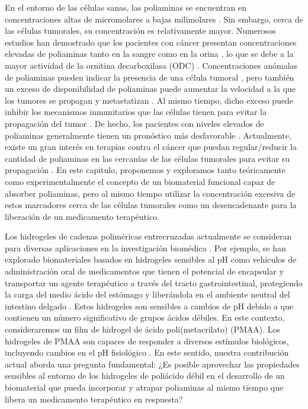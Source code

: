 En el entorno de las c\'elulas sanas, las poliaminas se encuentran en concentraciones altas de micromolares a bajas milimolares \cite{porter1983, Russell}.
Sin embargo, cerca de las c\'elulas tumorales, su concentraci\'on es relativamente mayor.
Numerosos estudios han demostrado que los pacientes con c\'ancer presentan concentraciones elevadas de poliaminas tanto en la sangre como en la orina \cite{russell1971}, lo que se debe a la mayor actividad de la ornitina decarboxilasa (ODC) \cite{Soda2011,agostinelli2010polyamines,nowotarski2013}.
Concentraciones an\'omalas de poliaminas pueden indicar la presencia de una c\'elula tumoral \cite{park2013,gerner2004}, pero tambi\'en un exceso de disponibilidad de poliaminas puede aumentar la velocidad a la que los tumores se propagan y metastatizan \cite{Soda2011}.
Al mismo tiempo, dicho exceso puede inhibir los mecanismos inmunitarios que las c\'elulas tienen para evitar la propagaci\'on del tumor \cite{Soda2011,jasnis1994polyamines}.
De hecho, los pacientes con niveles elevados de poliaminas generalmente tienen un pron\'ostico m\'as desfavorable \cite{Soda2011,ikeda2011montmorillonite}.
Actualmente, existe un gran inter\'es en terapias contra el c\'ancer que puedan regular/reducir la cantidad de poliaminas en las cercan\'ias de las c\'elulas tumorales para evitar su propagaci\'on \cite{Soda2011,aziz1996potential,chen2006combination, bachrach2004polyamines}.
En este capitulo, proponemos y exploramos tanto te\'oricamente como experimentalmente el concepto de un biomaterial funcional capaz de absorber poliaminas, pero al mismo tiempo utilizar la concentraci\'on excesiva de estos marcadores cerca de las c\'elulas tumorales como un desencadenante para la liberaci\'on de un medicamento terap\'eutico.

Los hidrogeles de cadenas polim\'ericas entrecruzadas actualmente se consideran para diversas aplicaciones en la investigaci\'on biom\'edica \cite{wang2019}.
Por ejemplo, se han explorado biomateriales basados en hidrogeles sensibles al pH como veh\'iculos de administraci\'on oral de medicamentos que tienen el potencial de encapsular y transportar un agente terap\'eutico a trav\'es del tracto gastrointestinal, protegiendo la carga del medio \'acido del est\'omago y liber\'andola en el ambiente neutral del intestino delgado  \cite{lowman1999,zhao2019,qindeel2019,li2019}.
Estos hidrogeles son sensibles a cambios de pH debido a que contienen un n\'umero significativo de grupos \'acidos d\'ebiles.
En este contexto, consideraremos un film de hidrogel de \'acido poli(metacrilato) (PMAA).
Los hidrogeles de PMAA son capaces de responder a diversos est\'imulos biol\'ogicos, incluyendo cambios en el pH fisiol\'ogico \cite{kanamala2016mechanisms}.
En este sentido, nuestra contribuci\'on actual aborda una pregunta fundamental: ¿Es posible aprovechar las propiedades sensibles al entorno de los hidrogeles de poli\'acido d\'ebil en el desarrollo de un biomaterial que pueda incorporar y atrapar poliaminas al mismo tiempo que libera un medicamento terap\'eutico en respuesta?

